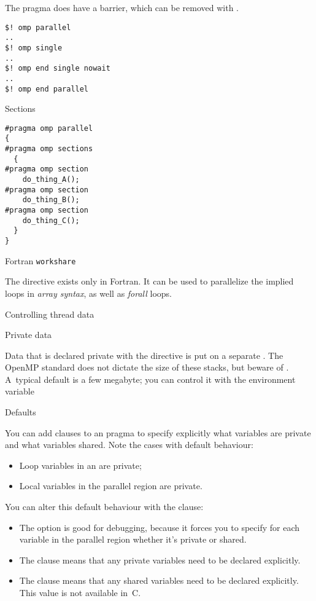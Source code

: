 The  pragma does have a barrier, which can be removed with
.
\begin{verbatim}
$! omp parallel
..
$! omp single
..
$! omp end single nowait
..
$! omp end parallel
\end{verbatim}

 {Sections}

\begin{verbatim}
#pragma omp parallel
{
#pragma omp sections
  {
#pragma omp section
    do_thing_A();
#pragma omp section
    do_thing_B();
#pragma omp section
    do_thing_C();
  }
}
\end{verbatim}

 {Fortran \texttt{workshare}}

The  directive exists only in Fortran.
It can be used to parallelize
the implied loops in \emph{array syntax},
as well as  \emph{forall} loops.


 {Controlling thread data}


 {Private data}

Data that is declared private with the  directive is
put on a separate . The OpenMP standard
does not dictate the size of these stacks, but beware of .
A~typical default
is a few megabyte; you can control it with the environment variable


 {Defaults}

You can add clauses to an  pragma
to specify explicitly what variables are private and what variables shared.
Note the cases with default behaviour:
\begin{itemize}
\item Loop variables in an  are private;
\item Local variables in the parallel region are private.
\end{itemize}
You can alter this default behaviour with the  clause:
\begin{itemize}
\item The  option is good for debugging, 
  because it forces you to specify for each variable in the parallel region
  whether it's private or shared.
\item The  clause means that any private variables
  need to be declared explicitly.
\item The  clause means that any shared variables
  need to be declared explicitly. This value is not available in~C.
\end{itemize}

